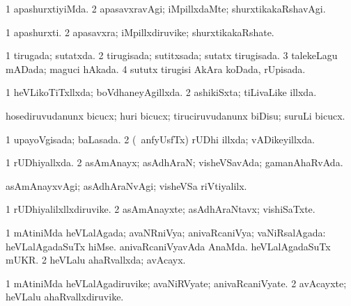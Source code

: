 {{\bentry 
{} 
\gl{\kirxvi}
\expl{}
\bmng
\bnum
\num{1} apashurxtiyiMda. 
\num{2} apasavxravAgi; iMpillxdaMte; shurxtikakaRshavAgi. 
\enum
\emng
\eentry

\bentry
{} 
\gl{\nA}
\expl{}
\bmng
\bnum
\num{1} apashurxti. 
\num{2} apasavxra; iMpillxdiruvike; shurxtikakaRshate. 
\enum
\emng
\eentry

\bentry
{} 
\gl{\gu}
\expl{}
\bmng
\bnum
\num{1} tirugada; sutatxda. 
\num{2} tirugisada; sutitxsada; sutatx tirugisada. 
\num{3} talekeLagu mADada; maguci hAkada. 
\num{4} sututx tirugisi AkAra koDada, rUpisada. 
\enum
\emng
\eentry

\bentry
{} 
\gl{\gu}
\expl{}
\bmng
\bnum
\num{1} heVLikoTiTxllxda; boVdhaneyAgillxda. 
\num{2} ashikiSxta; tiLivaLike illxda. 
\enum
\emng
\eentry

\bentry
{} 
\gl{\sakirx}
\expl{}
\bmng
hosediruvudanunx bicucx; huri bicucx; tiruciruvudanunx biDisu; suruLi bicucx. 
\emng
\eentry

\bentry
{} 
\gl{\gu}
\expl{}
\bmng
\bnum
\num{1} upayoVgisada; baLasada. 
\num{2} (\ucAcx\ anfyUsfTx) rUDhi illxda; vADikeyillxda. 
\enum
\emng
\eentry

\bentry
{} 
\gl{\gu}
\expl{}
\bmng
\bnum
\num{1} rUDhiyallxda. 
\num{2} asAmAnayx; asAdhAraN; visheVSavAda; gamanAhaRvAda. 
\enum
\emng
\eentry

\bentry
{} 
\gl{\kirxvi}
\expl{}
\bmng
asAmAnayxvAgi; asAdhAraNvAgi; visheVSa riVtiyalilx. 
\emng
\eentry

\bentry
{} 
\gl{\nA}
\expl{}
\bmng
\bnum
\num{1} rUDhiyalilxllxdiruvike. 
\num{2} asAmAnayxte; asAdhAraNtavx; vishiSaTxte. 
\enum
\emng
\eentry

\bentry
{} 
\gl{\gu}
\expl{}
\bmng
\bnum
\num{1} mAtiniMda heVLalAgada; avaNRniVya; anivaRcaniVya; vaNiRsalAgada:  heVLalAgadaSuTx hiMse.  anivaRcaniVyavAda AnaMda.  heVLalAgadaSuTx mUKR. 
\num{2} heVLalu ahaRvallxda; avAcayx. 
\enum
\emng
\eentry

\bentry
{} 
\gl{\nA}
\expl{}
\bmng
\bnum
\num{1} mAtiniMda heVLalAgadiruvike; avaNiRVyate; anivaRcaniVyate. 
\num{2} avAcayxte; heVLalu ahaRvallxdiruvike. 
\enum
\emng
\eentry

}}
